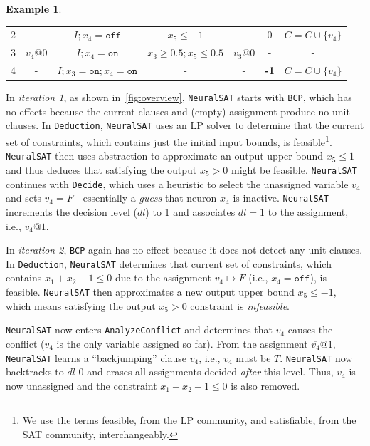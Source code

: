 \documentclass[oneside,11pt,dvipsnames]{book}
\numberwithin{equation}{section}
\theoremstyle{definition}
\newtheorem{example}{Example}[section]
\theoremstyle{remark}
\newcommand{\neuralsat}{\texttt{NeuralSAT}}
\begin{document}
\begin{example}
\begin{table}
\begin{tabular}{ccccccc}
        2 &-&$I; x_4=\texttt{off}$&$ x_5 \le -1$& - & 0 &  $C = C \cup \{v_4\}$\\

        3 &$v_4@0$&$I; x_4=\texttt{on} $&$ x_3 \ge 0.5; x_5 \le 0.5$ & $v_3@0$&-&-\\

        4 &-&$I; x_3=\texttt{on}; x_4=\texttt{on}$&-&- & \bf{-1} & $C = C\cup \{\overline{v_4}\}$\\


         \bottomrule
      \end{tabular}
  \end{table}



In \emph{iteration 1}, as shown in~\autoref{fig:overview}, \neuralsat{} starts with \texttt{BCP}, which has no effects because the current clauses and (empty) assignment produce no unit clauses.
In \texttt{Deduction}, \neuralsat{} uses an LP solver to determine that the current set of constraints, which contains just the initial input bounds, is feasible\footnote{We use the terms feasible, from the LP community, and satisfiable, from the SAT community, interchangeably.}. \neuralsat{} then uses abstraction to approximate an output upper bound $x_5 \le 1$ and thus deduces that satisfying the output $x_5 >0$ might be feasible. \neuralsat{} continues with \texttt{Decide}, which uses a heuristic to select the unassigned variable $v_4$ and sets $v_4=F$---essentially a \emph{guess} that neuron $x_4$ is inactive. \neuralsat{} increments the decision level ($dl$) to 1 and associates $dl=1$ to the assignment, i.e., $\overline{v_4}@1$.


In \emph{iteration 2}, \texttt{BCP} again has no effect because it does not detect any unit clauses. In \texttt{Deduction}, \neuralsat{} determines that current set of constraints, which contains $x_1 + x_2 - 1 \le 0$ due to the assignment $v_4\mapsto F$ (i.e., $x_4=\texttt{off}$), is feasible. \neuralsat{} then approximates a new output upper bound $x_5\le -1$, which means satisfying the output $x_5 > 0$ constraint is \emph{infeasible}.

\neuralsat{} now enters \texttt{AnalyzeConflict} and determines that $v_4$ causes the conflict ($v_4$ is the only variable assigned so far).  From the assignment $\overline{v_4}@1$, \neuralsat{} learns a ``backjumping'' clause $v_4$, i.e., $v_4$ must be $T$. \neuralsat{} now backtracks to $dl$ $0$ and erases all assignments decided \emph{after} this level. Thus, $v_4$ is now unassigned and the constraint  $x_1 + x_2 - 1 \le 0$ is also removed.


\end{example}
\end{document}
